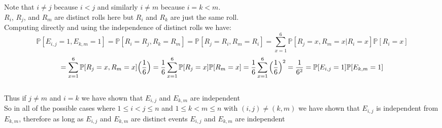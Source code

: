 \documentclass{article}
\begin{document}
\begin{center}
\doublespacing
    Note that $i\neq j$ because $i < j$ and similarly $i\neq m$ because $i = k < m$.
    \\$R_i$, $R_j$, and $R_m$ are distinct rolls here but $R_i$ and $R_k$ are just the same roll.
    \\Computing directly and using the independence of distinct rolls we have:
    \[\mathbb{P}[E_{i,j} = 1, E_{k,m} = 1] =\mathbb{P}[R_i = R_j, R_k = R_m] =\mathbb{P}[R_j = R_i, R_m = R_i] =\sum_{x=1}^6\mathbb{P}[R_j = x, R_m = x | R_i = x]\mathbb{P}[R_i = x]\]
    \[=\sum_{x=1}^6\mathbb{P}[R_j = x, R_m = x]\Big{(}\frac{1}{6}\Big{)} =\frac{1}{6}\sum_{x=1}^6\mathbb{P}[R_j = x]\mathbb{P}[R_m = x] =\frac{1}{6}\sum_{x=1}^6\Big{(}\frac{1}{6}\Big{)}^2 =\frac{1}{6^2} =\mathbb{P}[E_{i,j} = 1]\mathbb{P}[E_{k,m} = 1]\]
    \\Thus if $j\neq m$ and $i = k$ we have shown that $E_{i,j}$ and $E_{k,m}$ are independent \qedsymbol
    \break\break\break\break\break\break
    \\So in all of the possible cases where $1\leq i < j\leq n$ and $1\leq k < m\leq n$ with $(i, j)\neq (k, m)$ we have shown that $E_{i,j}$ is independent from $E_{k,m}$, therefore as long as $E_{i,j}$ and $E_{k,m}$ are distinct events $E_{i,j}$ and $E_{k,m}$ are independent \qedsymbol
\end{center}


\newpage
\end{document}
